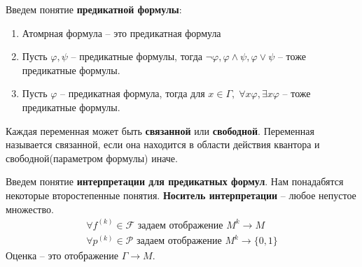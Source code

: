 \begin{conj}
    Введем понятие \textbf{предикатной формулы}:
    \begin{enumerate}
        \item Атомрная формула -- это предикатная формула
        \item Пусть $\varphi, \psi$ -- предикатные формулы, тогда $\lnot \varphi, \varphi \land \psi, \varphi \lor \psi$ -- тоже предикатные формулы. 
        \item Пусть $\varphi$ -- предикатная формула, тогда для $x \in \Gamma, \; \forall x \varphi, \exists x \varphi$ -- тоже предикатные формулы.  
    \end{enumerate} 
\end{conj}

\begin{conj}
    Каждая переменная может быть \textbf{связанной} или \textbf{свободной}. Переменная называется связанной, если она находится в области действия квантора и свободной(параметром формулы) иначе.
\end{conj}

\begin{conj}
    Введем понятие \textbf{интерпретации для предикатных формул}. Нам понадабятся некоторые 
    второстепенные понятия. 
    \textbf{Носитель интерпретации} -- любое непустое множество. 
    \begin{gather*}
        \forall f^{(k)} \in \mathcal{F} \textbf{ задаем отображение } M^k \longrightarrow M \\
        \forall p^{(k)} \in \mathcal{P} \textbf{ задаем отображение } M^k \longrightarrow \{0, 1\}
    \end{gather*}
    Оценка -- это отображение $\Gamma \longrightarrow M$. 
\end{conj}

